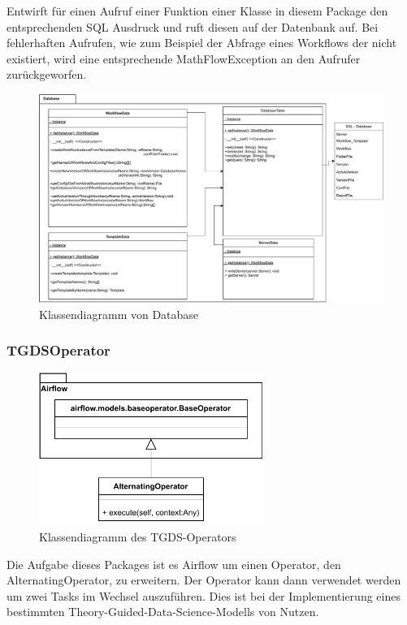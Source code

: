 \subsubsection{}
Entwirft für einen Aufruf einer Funktion einer Klasse in diesem Package den entsprechenden SQL Ausdruck und ruft diesen auf der Datenbank auf.
Bei fehlerhaften Aufrufen, wie zum Beispiel der Abfrage eines Workflows der nicht existiert, wird eine entsprechende MathFlowException an den Aufrufer zurückgeworfen.
\begin{figure}[H]
	\centering
	\includegraphics[width=1\textwidth]{res/Database_Package.pdf} 
	\caption{Klassendiagramm von Database}
	\label{fig:database_package}
\end{figure}


\subsubsection{TGDSOperator}
\begin{figure}[H]
    \centering
    \includegraphics[width=0.65\textwidth]{res/Klassen/tgdsOp.pdf}
    \caption{Klassendiagramm des TGDS-Operators}
\end{figure}
Die Aufgabe dieses Packages ist es Airflow um einen Operator, den AlternatingOperator, zu erweitern.
Der Operator kann dann verwendet werden um zwei Tasks im Wechsel auszuführen. 
Dies ist bei der Implementierung eines bestimmten Theory-Guided-Data-Science-Modells von Nutzen. 


